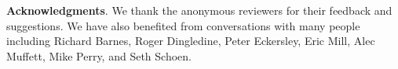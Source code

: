 \documentclass[10pt, conference, compsocconf]{styles/IEEEtran}
\newcommand{\point}[1]{\noindent\textbf{#1}.}
\begin{document}
\point{Acknowledgments}
We thank the anonymous reviewers for their feedback and suggestions.
We have also benefited from conversations with many people including
Richard Barnes, Roger Dingledine, Peter Eckersley, Eric Mill, Alec
Muffett, Mike Perry, and Seth Schoen.



 
\newcommand{\BIBdecl}{\setlength{\itemsep}{0\baselineskip plus 0.1\baselineskip minus 0.1\baselineskip}}
\balance
{\footnotesize 


}

 
%
\end{document}
